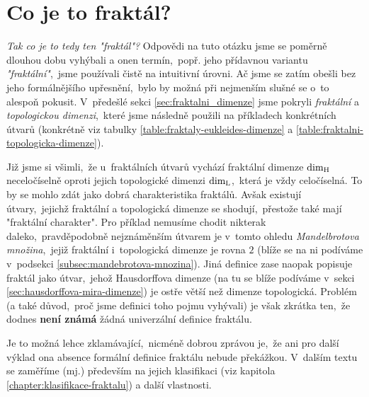 \section{Co je to fraktál?}\label{sec:co-je-to-fraktal}
\emph{Tak co je to tedy ten "fraktál"?} Odpovědi na tuto otázku jsme se poměrně dlouhou dobu vyhýbali a onen termín,~popř. jeho přídavnou variantu \emph{"fraktální"},~jsme používali čistě na intuitivní úrovni. Ač jsme se zatím obešli bez jeho formálnějšího upřesnění,~bylo by možná při nejmenším slušné se o~to alespoň pokusit. V~předešlé sekci \ref{sec:fraktalni_dimenze} jsme pokryli \emph{fraktální} a \emph{topologickou dimenzi},~které jsme následně použili na příkladech konkrétních útvarů (konkrétně viz tabulky \ref{table:fraktaly-eukleides-dimenze} a \ref{table:fraktalni-topologicka-dimenze}).

Již jsme si všimli,~že u~fraktálních útvarů vychází fraktální dimenze $\operatorname{dim_H}$ neceločíselně oproti jejich topologické dimenzi $\operatorname{dim_L}$,~která je vždy celočíselná. To by se mohlo zdát jako dobrá charakteristika fraktálů. Avšak existují útvary,~jejichž fraktální a topologická dimenze se shodují,~přestože také mají "fraktální charakter". Pro příklad nemusíme chodit nikterak daleko,~pravděpodobně nejznáměnším útvarem je v~tomto ohledu \emph{Mandelbrotova množina},~jejiž fraktální i~topologická dimenze je rovna $2$ (blíže se na ni podíváme v~podsekci \ref{subsec:mandebrotova-mnozina}). Jiná definice zase naopak popisuje fraktál jako útvar,~jehož Hausdorffova dimenze (na tu se blíže podíváme v~sekci \ref{sec:hausdorffova-mira-dimenze}) je ostře větší než dimenze topologická. Problém (a také důvod,~proč jsme definici toho pojmu vyhývali) je však zkrátka ten,~že dodnes \textbf{není známá} žádná univerzální definice fraktálu. \cite[str. 226]{Voracova2022}

Je to možná lehce zklamávající,~nicméně dobrou zprávou je,~že ani pro další výklad ona absence formální definice fraktálu nebude překážkou. V~dalším textu se zaměříme (mj.) především na jejich klasifikaci (viz kapitola \ref{chapter:klasifikace-fraktalu}) a další vlastnosti.